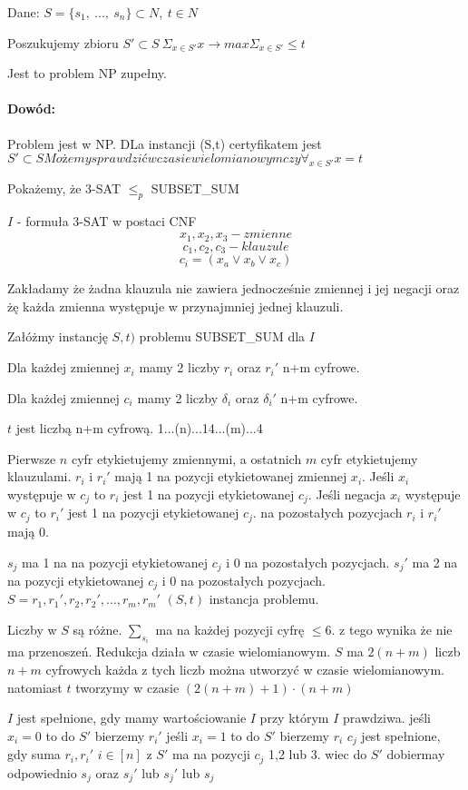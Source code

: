 Dane: $S=\lbrace s_1,\ ...,\ s_n \rbrace \subset N,\ t\in N$

Poszukujemy zbioru $S'\subset S\ \Sigma_{x\in S'}x \rightarrow max\Sigma_{x\in S'}\leq t$

Jest to problem NP zupełny.

\paragraph{Dowód:}{Problem jest w NP. DLa instancji (S,t) certyfikatem jest $S' \subset S Możemy sprawdzić w czasie wielomianowym czy \forall_{x \in S'} x = t$}

Pokażemy, że 3-SAT $\leq_p$ SUBSET_SUM 

$I$ - formuła 3-SAT w postaci CNF
$$ x_1, x_2, x_3 - zmienne$$
$$ c_1, c_2, c_3 - klauzule$$
$$ c_i = (x_a \lor x_b \lor x_c)$$

Zakładamy że żadna klauzula nie zawiera jednocześnie zmiennej i jej negacji oraz żę każda zmienna występuje w przynajmniej jednej klauzuli.

Załóżmy instancję $S,t)$ problemu SUBSET_SUM dla $I$

Dla każdej zmiennej $x_i$ mamy 2 liczby $r_i$ oraz $r_i'$ n+m cyfrowe.

Dla każdej zmiennej $c_i$ mamy 2 liczby $\delta_i$ oraz $\delta_i'$ n+m cyfrowe.

$t$ jest liczbą n+m cyfrową. 1...(n)...14...(m)...4

Pierwsze $n$ cyfr etykietujemy zmiennymi, a ostatnich $m$ cyfr etykietujemy klauzulami.
$r_i$ i $r_i'$ mają 1 na pozycji etykietowanej zmiennej $x_i$.
Jeśli $x_i$ występuje w $c_j$ to $r_i$ jest 1 na pozycji etykietowanej $c_j$.
Jeśli negacja $x_i$ występuje w $c_j$ to $r_i'$ jest 1 na pozycji etykietowanej $c_j$. na pozostałych pozycjach $r_i$ i $r_i'$ mają 0.

$s_j$ ma 1 na na pozycji etykietowanej $c_j$ i 0 na pozostałych pozycjach.
$s_j'$ ma 2 na na pozycji etykietowanej $c_j$ i 0 na pozostałych pozycjach.
$S = {r_1, r_1', r_2, r_2', ..., r_m,r_m'}$
$(S,t)$ instancja problemu.

Liczby w $S$ są różne. $\sum_{s_i}$ ma na każdej pozycji cyfrę $\leq 6$.
z tego wynika że nie ma przenoszeń.
Redukcja działa w czasie wielomianowym.
$S$ ma $2(n+m)$ liczb $n+m$ cyfrowych każda z tych liczb można utworzyć w czasie wielomianowym. natomiast $t$ tworzymy w czasie $(2(n+m)+1)\cdot(n+m)$

$I$ jest spełnione, gdy mamy wartościowanie $I$ przy którym $I$ prawdziwa.
jeśli $x_i=0$ to do $S'$ bierzemy $r_i'$
jeśli $x_i=1$ to do $S'$ bierzemy $r_i$
$c_j$ jest spełnione, gdy suma $r_i, r_i'$  $i \in [n]$ z $S'$ ma na pozycji $c_j$  1,2 lub 3. wiec do $S'$ dobiermay odpowiednio $s_j$ oraz $s_j'$ lub $s_j'$ lub $s_j$
 
